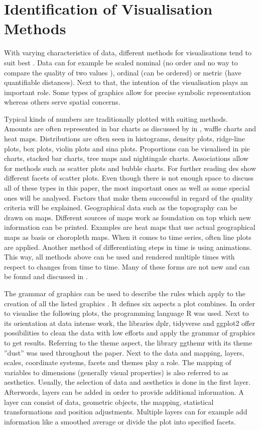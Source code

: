 \section{Identification of Visualisation Methods}
With varying characteristics of data, different methods for visualisations tend to suit best \citep{robertson1990}. Data can for example be scaled nominal (no order and no way to compare the quality of two values ), ordinal (can be ordered) or metric (have quantifiable distances). Next to that, the intention of the visualisation plays an important role. Some types of graphics allow for precise symbolic representation whereas others serve spatial concerns.

Typical kinds of numbers are traditionally plotted with suiting methods. Amounts are often represented in bar charts as discussed by in \cite{talbot2014}, waffle charts and heat maps. Distributions are often seen in histograms, density plots, ridge-line plots, box plots, violin plots and sina plots. Proportions can be visualised in pie charts, stacked bar charts, tree maps and nightingale charts. Associations allow for methods such as scatter plots and bubble charts. For further reading des \cite{cleveland1984b} show different facets of scatter plots. Even though there is not enough space to discuss all of these types in this paper, the most important ones as well as some special ones will be analysed. Factors that make them successful in regard of the quality criteria will be explained. Geographical data such as the topography can be drawn on maps. Different sources of maps work as foundation on top which new information can be printed. Examples are heat maps that use actual geographical maps as basis or choropleth maps. When it comes to time series, often line plots are applied. Another method of differentiating steps in time is using animations. This way, all methods above can be used and rendered multiple times with respect to changes from time to time. Many of these forms are not new and can be found and discussed in \citep{cleveland1984}.

The grammar of graphics can be used to describe the rules which apply to the creation of all the listed graphics \citep{healy2018}. It defines six aspects a plot combines. In order to visualise the following plots, the programming language R was used. Next to its orientation at data intense work, the libraries dplr, tidyverse and ggplot2 offer possibilities to clean the data with low efforts and apply the grammar of graphics to get results. Referring to the theme aspect, the library ggthemr with its theme ''dust'' was used throughout the paper. Next to the data and mapping, layers, scales, coordinate systems, facets and themes play a role. The mapping of variables to dimensions (generally visual properties) is also referred to as aesthetics. Usually, the selection of data and aesthetics is done in the first layer. Afterwords, layers can be added in order to provide additional information. A layer can consist of data, geometric objects, the mapping, statistical transformations and position adjustments. Multiple layers can for example add information like a smoothed average or divide the plot into specified facets.
 

